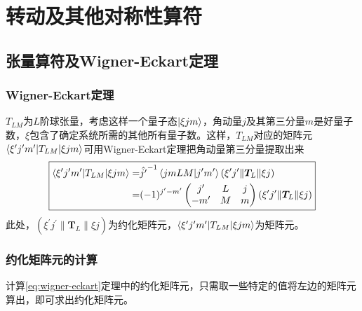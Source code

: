 \chapter{转动及其他对称性算符}

\section{张量算符及Wigner-Eckart定理}

\subsection{Wigner-Eckart定理}
$T_{LM}$为$L$阶球张量，考虑这样一个量子态$\ket{\xi j m}$，角动量$j$及其第三分量$m$是好量子数，$\xi$包含了确定系统所需的其他所有量子数。这样，$T_{LM}$对应的矩阵元$\braket{\xi^{\prime} j^{\prime} m^{\prime} | T_{LM} | \xi j m}$可用Wigner-Eckart定理把角动量第三分量提取出来
\begin{equation}
    \boxed{
    \begin{aligned}
        \braket{\xi^{\prime} j^{\prime} m^{\prime} | T_{LM} | \xi j m}
        =& \hat{j^{\prime}}^{-1}\braket{jmLM | j^{\prime} m^{\prime}}
        \left(\xi^{\prime} j^{\prime} \| \bm{T}_{L} \| \xi j \right) \\
        =& (-1)^{j^\prime - m^\prime}
        \begin{pmatrix}
            j^{\prime} & L & j \\
            -m^{\prime}& M & m
        \end{pmatrix}
        \left(\xi^{\prime} j^{\prime} \| \bm{T}_{L} \| \xi j \right)      
    \end{aligned}
    }
    \label{eq:wigner-eckart}
\end{equation}
此处，$\left(\xi^{\prime} j^{\prime} \| \bm{T}_{L} \| \xi j \right)$为约化矩阵元，$\braket{\xi^{\prime} j^{\prime} m^{\prime} | T_{LM} | \xi j m}$为矩阵元。

\subsection{约化矩阵元的计算}
计算\cref{eq:wigner-eckart}定理中的约化矩阵元，只需取一些特定的值将左边的矩阵元算出，即可求出约化矩阵元。 


